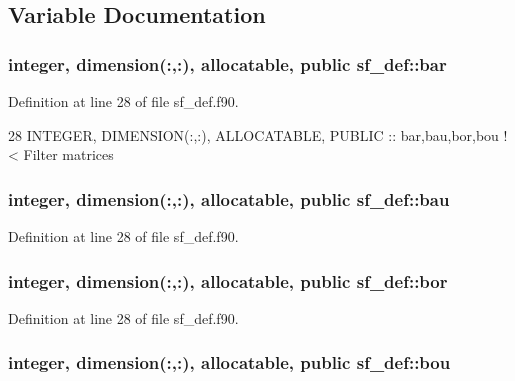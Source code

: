 \subsection{Variable Documentation}
\subsubsection[{\texorpdfstring{bar}{bar}}]{\setlength{\rightskip}{0pt plus 5cm}integer, dimension(\+:,\+:), allocatable, public sf\+\_\+def\+::bar}\hypertarget{namespacesf__def_ac5f61e46d21a461afc857f50b9c24899}{}\label{namespacesf__def_ac5f61e46d21a461afc857f50b9c24899}


Definition at line 28 of file sf\+\_\+def.\+f90.


\begin{DoxyCode}
28   \textcolor{keywordtype}{INTEGER}, \textcolor{keywordtype}{DIMENSION(:,:)}, \textcolor{keywordtype}{ALLOCATABLE}, \textcolor{keywordtype}{PUBLIC} :: bar,bau,bor,bou\textcolor{comment}{  !< Filter matrices }
\end{DoxyCode}
\subsubsection[{\texorpdfstring{bau}{bau}}]{\setlength{\rightskip}{0pt plus 5cm}integer, dimension(\+:,\+:), allocatable, public sf\+\_\+def\+::bau}\hypertarget{namespacesf__def_a3095931864a7ebf98dce2d5642031e58}{}\label{namespacesf__def_a3095931864a7ebf98dce2d5642031e58}


Definition at line 28 of file sf\+\_\+def.\+f90.

\subsubsection[{\texorpdfstring{bor}{bor}}]{\setlength{\rightskip}{0pt plus 5cm}integer, dimension(\+:,\+:), allocatable, public sf\+\_\+def\+::bor}\hypertarget{namespacesf__def_aa44fe776297bd93ef2a0c8a1457dbf41}{}\label{namespacesf__def_aa44fe776297bd93ef2a0c8a1457dbf41}


Definition at line 28 of file sf\+\_\+def.\+f90.

\subsubsection[{\texorpdfstring{bou}{bou}}]{\setlength{\rightskip}{0pt plus 5cm}integer, dimension(\+:,\+:), allocatable, public sf\+\_\+def\+::bou}\hypertarget{namespacesf__def_a349d2708598e0e0782cc21e8566208b5}{}\label{namespacesf__def_a349d2708598e0e0782cc21e8566208b5}


